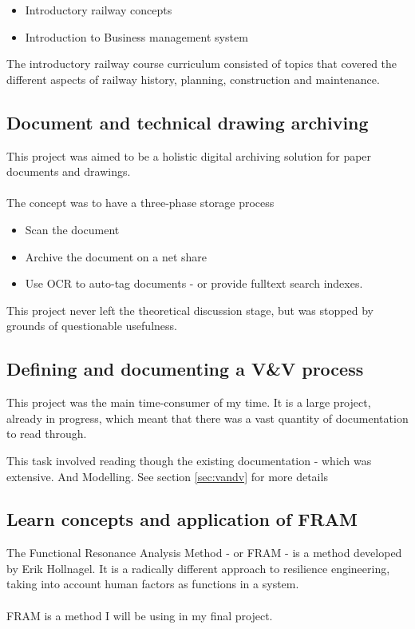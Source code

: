 \documentclass[11pt,a4paper,UKenglish]{article}
\begin{document}
\begin{itemize}
  \item Introductory railway concepts
  \item Introduction to Business management system
\end{itemize}
The introductory railway course curriculum consisted of topics that covered the different aspects of railway history, planning, construction and maintenance. 

\subsection{Document and technical drawing archiving}
This project was aimed to be a holistic digital archiving solution for paper documents and drawings.\\\\
The concept was to have a three-phase storage process
\begin{itemize}
  \item Scan the document
  \item Archive the document on a net share
  \item Use OCR to auto-tag documents - or provide fulltext search indexes.
\end{itemize}
This project never left the theoretical discussion stage, but was stopped by grounds of questionable usefulness.

\subsection{Defining and documenting a V\&V process}
This project was the main time-consumer of my time. It is a large project, already in progress, which meant that there was a vast quantity of documentation to read through.

This task involved reading though the existing documentation - which was extensive. And Modelling. See section \ref{sec:vandv} for more details


\subsection{Learn concepts and application of FRAM}
The Functional Resonance Analysis Method - or FRAM - is a method developed by Erik Hollnagel. It is a radically different approach to resilience engineering, taking into account human factors as functions in a system.\\\\
FRAM is a method I will be using in my final project.
\end{document}
